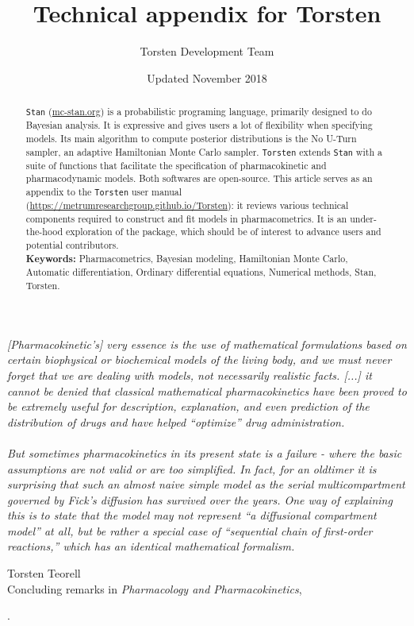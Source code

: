 \documentclass[11pt]{article}
\title{\textbf{Technical appendix for Torsten}}
\author{Torsten Development Team}
\date{Updated November 2018}
\begin{document}
\maketitle

\begin{abstract}
  \texttt{Stan} (\url{mc-stan.org}) is a probabilistic programing language, primarily designed to do Bayesian analysis.
  It is expressive and gives users a lot of flexibility when specifying models.
  Its main algorithm to compute posterior distributions is the No U-Turn sampler,
  an adaptive Hamiltonian Monte Carlo sampler.
  \texttt{Torsten} extends \texttt{Stan} with a suite of functions that facilitate the specification
  of pharmacokinetic and pharmacodynamic models.
  Both softwares are open-source.
  This article serves as an appendix to the \texttt{Torsten} 
  user manual (\url{https://metrumresearchgroup.github.io/Torsten}):
  it reviews various technical components required to construct and fit models in
  pharmacometrics. It is an under-the-hood exploration of the package, which should be of
  interest to advance users and potential contributors.  \\
  
  \noindent \textbf{Keywords:} Pharmacometrics, Bayesian modeling, Hamiltonian Monte Carlo,
  Automatic differentiation, Ordinary differential equations, Numerical methods, Stan, Torsten.
\end{abstract}

\clearpage

\tableofcontents

\clearpage
\setlength{\epigraphwidth}{0.8\textwidth}
\epigraph{
\textit{[Pharmacokinetic's] very essence is the use of mathematical
formulations based on certain biophysical or biochemical models of the
living body, and we must never forget that we are dealing with models, not necessarily
realistic facts. [...] it cannot be denied that classical mathematical
pharmacokinetics have been proved to be extremely useful for description,
explanation, and even prediction of the distribution of drugs and have
helped ``optimize'' drug administration. \\ \ \\
But sometimes pharmacokinetics in its present state is a failure - where
the basic assumptions are not valid or are too simplified. In fact, for an
oldtimer it is surprising that such an almost naive simple model as the
serial multicompartment governed by Fick's diffusion has survived over the
years. One way of explaining this is to state that the model may not represent
``a diffusional compartment model'' at all, but be rather a special case of
``sequential chain of first-order reactions,'' which has an identical mathematical
formalism.}}{Torsten Teorell \\ Concluding
remarks in \textit{Pharmacology and Pharmacokinetics}, \\ \cite{Teorell:1974}}. 
\end{document}
